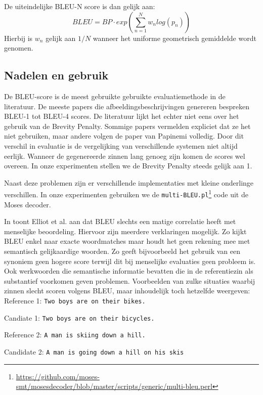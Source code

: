 De uiteindelijke BLEU-N score is dan gelijk aan:
\begin{equation}
BLEU = BP\cdot exp(\sum\limits_{n=1}^N w_nlog(p_n))
\end{equation}
Hierbij is $w_n$ gelijk aan $1/N$ wanneer het uniforme geometrisch gemiddelde wordt genomen.

\subsection{Nadelen en gebruik}
De BLEU-score is de meest gebruikte gebruikte evaluatiemethode in de literatuur. De meeste papers die afbeeldingsbeschrijvingen genereren bespreken BLEU-1 tot BLEU-4 scores. De literatuur lijkt het echter niet eens over het gebruik van de Brevity Penalty. Sommige papers vermelden expliciet dat ze het niet gebruiken, maar andere volgen de paper van Papinemi volledig. Door dit verschil in evaluatie is de vergelijking van verschillende systemen niet altijd eerlijk. Wanneer de gegenereerde zinnen lang genoeg zijn komen de scores wel overeen.
In onze experimenten stellen we de Brevity Penalty steeds gelijk aan 1.

Naast deze problemen zijn er verschillende implementaties met kleine onderlinge verschillen. In onze experimenten gebruiken we de \texttt{multi-BLEU.pl}\footnote{\url{https://github.com/moses-smt/mosesdecoder/blob/master/scripts/generic/multi-bleu.perl}} code uit de Moses decoder.

In  toont Elliot et al. aan dat BLEU slechts een matige correlatie heeft met menselijke beoordeling.
Hiervoor zijn meerdere verklaringen mogelijk. Zo kijkt BLEU enkel naar exacte woordmatches maar houdt het geen rekening mee met semantisch gelijkaardige woorden. Zo geeft bijvoorbeeld het gebruik van een synoniem geen hogere score terwijl dit bij menselijke evaluaties geen probleem is. Ook werkwoorden die semantische informatie bevatten die in de referentiezin als substantief voorkomen geven problemen. Voorbeelden van zulke situaties waarbij zinnen slecht scoren volgens BLEU, maar inhoudelijk toch hetzelfde weergeven:
\\

Reference 1: \texttt{Two boys are on their bikes.}

Candiate 1: \texttt{Two boys are on their bicycles.}

Reference 2: \texttt{A man is skiing down a hill.}

Candidate 2: \texttt{A man is going down a hill on his skis}
\\

